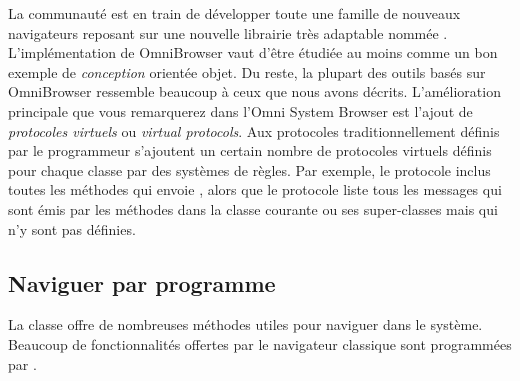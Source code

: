 \documentclass[a4paper,10pt,twoside]{book}
\begin{document}
La communaut\'e \sq est en train de d\'evelopper toute une famille de nouveaux
navigateurs reposant sur une nouvelle librairie tr\`es adaptable nomm\'ee
.  L'impl\'ementation de OmniBrowser vaut d'\^etre 
\'etudi\'ee au moins comme un bon exemple de \emph{conception} orient\'ee
objet. 
Du reste, la plupart des outils bas\'es sur OmniBrowser ressemble beaucoup
\`a ceux que nous avons d\'ecrits.
L'am\'elioration principale que vous remarquerez dans l'Omni System Browser 
est l'ajout de \emph{protocoles virtuels} ou \emph{virtual protocols}.
Aux protocoles traditionnellement d\'efinis par le programmeur s'ajoutent
un certain nombre de protocoles virtuels d\'efinis pour chaque classe 
par des syst\`emes de r\`egles. 
Par exemple, le protocole  inclus toutes
les m\'ethodes qui envoie \super, alors que le protocole
  liste tous les messages qui sont \'emis
par les m\'ethodes dans la classe courante ou ses super-classes 
mais qui n'y sont pas d\'efinies.




\subsection{Naviguer par programme}

La classe  offre de nombreuses m\'ethodes utiles
pour naviguer dans le syst\`eme.
Beaucoup de fonctionnalit\'es offertes par le navigateur classique
sont programm\'ees par
.
\end{document}
